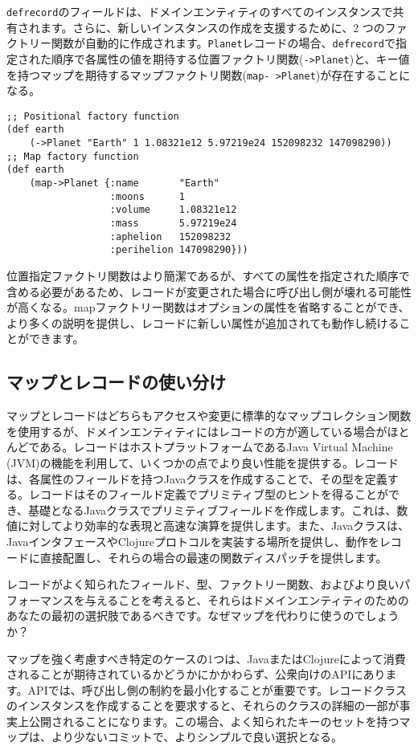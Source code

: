 \texttt{defrecord}のフィールドは、ドメインエンティティのすべてのインスタンスで共有されます。さらに、新しいインスタンスの作成を支援するために、2 つのファクトリー関数が自動的に作成されます。\texttt{Planet}レコードの場合、\texttt{defrecord}で指定された順序で各属性の値を期待する位置ファクトリ関数(\texttt{->Planet})と、キー値を持つマップを期待するマップファクトリ関数(\texttt{map- >Planet})が存在することになる。

\begin{lstlisting}[numbers=none]
;; Positional factory function
(def earth
    (->Planet "Earth" 1 1.08321e12 5.97219e24 152098232 147098290))
;; Map factory function
(def earth
    (map->Planet {:name       "Earth"
                  :moons      1
                  :volume     1.08321e12
                  :mass       5.97219e24
                  :aphelion   152098232
                  :perihelion 147098290}))
\end{lstlisting}

位置指定ファクトリ関数はより簡潔であるが、すべての属性を指定された順序で含める必要があるため、レコードが変更された場合に呼び出し側が壊れる可能性が高くなる。mapファクトリー関数はオプションの属性を省略することができ、より多くの説明を提供し、レコードに新しい属性が追加されても動作し続けることができます。

\subsection{マップとレコードの使い分け}

マップとレコードはどちらもアクセスや変更に標準的なマップコレクション関数を使用するが、ドメインエンティティにはレコードの方が適している場合がほとんどである。レコードはホストプラットフォームであるJava Virtual Machine (JVM)の機能を利用して、いくつかの点でより良い性能を提供する。レコードは、各属性のフィールドを持つJavaクラスを作成することで、その型を定義する。レコードはそのフィールド定義でプリミティブ型のヒントを得ることができ、基礎となるJavaクラスでプリミティブフィールドを作成します。これは、数値に対してより効率的な表現と高速な演算を提供します。また、Javaクラスは、JavaインタフェースやClojureプロトコルを実装する場所を提供し、動作をレコードに直接配置し、それらの場合の最速の関数ディスパッチを提供します。

レコードがよく知られたフィールド、型、ファクトリー関数、およびより良いパフォーマンスを与えることを考えると、それらはドメインエンティティのためのあなたの最初の選択肢であるべきです。なぜマップを代わりに使うのでしょうか？

マップを強く考慮すべき特定のケースの1つは、JavaまたはClojureによって消費されることが期待されているかどうかにかかわらず、公衆向けのAPIにあります。APIでは、呼び出し側の制約を最小化することが重要です。レコードクラスのインスタンスを作成することを要求すると、それらのクラスの詳細の一部が事実上公開されることになります。この場合、よく知られたキーのセットを持つマップは、より少ないコミットで、よりシンプルで良い選択となる。

